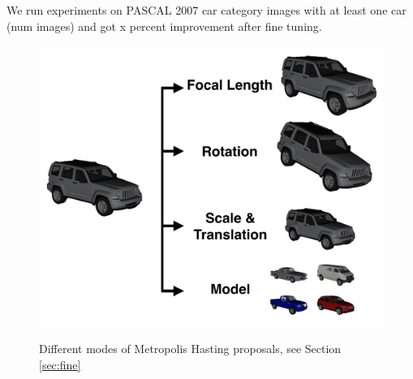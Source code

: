 \documentclass[10pt,twocolumn,letterpaper]{article}
\begin{document}
We run experiments on PASCAL 2007 car category images with at least one car (num images) and got x percent improvement after fine tuning.



\begin{figure}[t]
\centering
    \includegraphics[width=0.7\linewidth]{tuning2} \\ [-5pt]
    \caption{Different modes of Metropolis Hasting proposals, see Section \ref{sec:fine}}
 \label{fig:tuningmode}
\end{figure}
    
\end{document}
